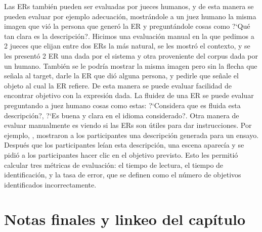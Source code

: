 Las ERs tambi\'en pueden ser evaluadas por jueces humanos, y de esta manera se pueden evaluar por ejemplo adecuaci\'on, mostr\'andole a un juez humano la misma imagen que vi\'o la persona que gener\'o la ER y pregunt\'andole cosas como ?`Qu\'e tan clara es la descripci\'on?.
Hicimos una evaluaci\'on manual en la que pedimos a 2 jueces que elijan entre dos ERs la m\'as natural, se les mostr\'o el contexto, y se les present\'o 2 ER una dada por el sistema y otra proveniente del corpus dada por un humano. Tambi\'en se le podr\'ia mostrar la misma imagen pero sin la flecha que se\~nala al target, darle la ER que di\'o alguna persona, y pedirle que se\~nale el objeto al cual la ER refiere. De esta manera se puede evaluar facilidad de encontrar objetivo con la expresi\'on dada.
La fluidez de una ER se puede evaluar preguntando a juez humano cosas como estas: 
?`Considera que es fluida esta descripci\'on?, ?`Es buena y clara en el idioma considerado?. 
Otra manera de evaluar manualmente es viendo si las ERs son \'utiles para dar instrucciones. Por ejemplo, \cite{BelzGattEvaluation}, mostraron a los participantes una descripci\'on generada para un ensayo. Despu\'es que los participantes le\'ian esta descripci\'on, una escena aparec\'ia y se pidi\'o a los participantes
hacer clic en el objetivo previsto. Esto les permiti\'o calcular tres m\'etricas de evaluaci\'on: %
el tiempo de lectura, el tiempo de identificaci\'on, y la tasa de error, que se definen como el n\'umero de objetivos identificados incorrectamente.


\section{Notas finales y linkeo del cap\'itulo}
\label{sec:linkeo2}

